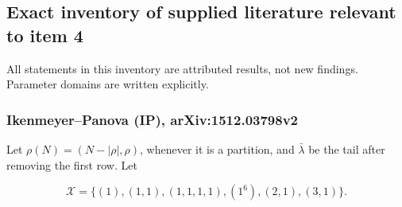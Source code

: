 \documentclass[
  10pt,
]{article}
\begin{document}
\subsection{Exact inventory of supplied literature relevant to item
4}\label{exact-inventory-of-supplied-literature-relevant-to-item-4}

All statements in this inventory are attributed results, not new
findings. Parameter domains are written explicitly.

\subsubsection{Ikenmeyer--Panova (IP),
arXiv:1512.03798v2}\label{ikenmeyerpanova-ip-arxiv1512.03798v2}

Let \(\rho(N)=(N-|\rho|,\rho)\), whenever it is a partition, and
\(\bar\lambda\) be the tail after removing the first row. Let

\[
\mathcal X=\{(1),(1,1),(1,1,1,1),(1^6),(2,1),(3,1)\}.
\]
\end{document}

